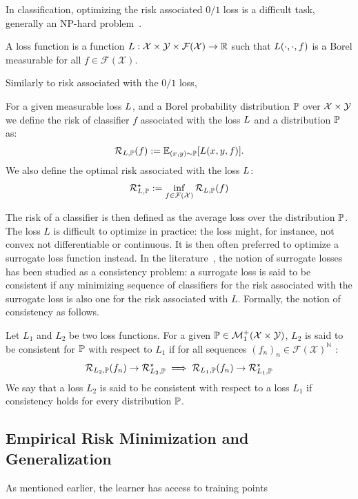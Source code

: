 In classification, optimizing the risk associated $0/1$ loss is a difficult task, generally an NP-hard problem~\cite{xxx}.  

\begin{definition} A loss function is a function $L:\mathcal{X}\times\mathcal{Y}\times \mathcal{F}(\mathcal{X})\to \mathbb{R}$ such that $L(\cdot,\cdot,f)$ is a Borel measurable for all $f\in\mathcal{F}(\mathcal{X})$. 
\end{definition}


Similarly to risk associated with the $0/1$ loss, 
\begin{definition}
For a given measurable loss $L$, and a Borel probability distribution $\mathbb{P}$ over $\mathcal{X}\times\mathcal{Y}$ we define the risk of classifier $f$ associated with the loss $L$ and a distribution $\mathbb{P}$ as:
\begin{align*}
     \mathcal{R}_{\loss,\PP}(f) := \mathbb{E}_{(x,y)\sim\PP}\left[\loss(x,y,f)\right].
\end{align*}
We also define the optimal risk associated with the loss $L$:
\begin{align*}
         \mathcal{R}_{L,\mathbb{P}}^\star := \inf_{f\in\mathcal{F}(\mathcal{X})}\mathcal{R}_{L,\mathbb{P}}(f)
\end{align*}
\end{definition}


The risk of a classifier is then defined as the average loss over the distribution $\mathbb{P}$. The loss $L$ is difficult to optimize in practice: the loss might, for instance, not convex  not differentiable or continuous. It is then often preferred to optimize a surrogate loss function instead. In the literature~\citep{zhang2004statistical,bartlett2006convexity,steinwart2007compare}, the notion of surrogate losses has been studied as a consistency problem: a surrogate loss is said to be consistent if any minimizing sequence of classifiers for the  risk associated with the surrogate loss is also one for the risk associated with $L$. Formally, the notion of consistency as  follows.

\begin{definition}[Consistency]
Let $L_1$ and $L_2$ be two loss functions. For a given $\mathbb{P}\in\mathcal{M}_1^+(\mathcal{X}\times\mathcal{Y})$, $L_2$ is said to be consistent for $\mathbb{P}$ with respect to $L_1$ if for all sequences $(f_n)_n \in \mathcal{F}(\mathcal{X})^\mathbb{N}$ :
\begin{align}
    \mathcal{R}_{L_2,\mathbb{P}}(f_n)\to \mathcal{R}_{L_2,\mathbb{P}}^\star\implies\mathcal{R}_{L_1,\mathbb{P}}(f_n)\to \mathcal{R}_{L_1,\mathbb{P}}^\star
\end{align}
We say that a loss $L_2$ is said to be consistent with respect to a loss $L_1$ if consistency holds for every distribution $\mathbb{P}$.
\end{definition}

\subsection{Empirical Risk Minimization and Generalization}

As mentioned earlier, the learner has access to training points 

